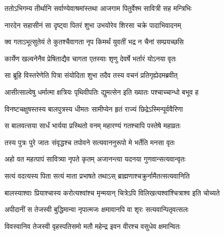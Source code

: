 \twolineshloka
{ततोऽभिगम्य तीर्थानि सर्वाण्येवाश्रमांस्तथा}
{आजगाम पितुर्वेश्म सावित्री सह मन्त्रिभिः}


\twolineshloka
{नारदेन सहासीनं सा दृष्ट्वा पितरं शुभा}
{उभयोरेव शिरसा चक्रे पादाभिवादनम्}




\twolineshloka
{क्व गताऽभूत्सुतेयं ते कुतश्चैवागता नृप}
{किमर्थं युवतीं भद्र न चैनां सम्प्रयच्छसि}




\twolineshloka
{कार्येण खल्वनेनैव प्रेषिताद्यैव चागता}
{एतस्याः शृणु देवर्षे भर्तारं योऽनया वृतः}




\twolineshloka
{सा ब्रूहि विस्तरेणेति पित्रा संयोदिता शुभा}
{तदैव तस्य वचनं प्रतिगृह्येदमब्रवीत्}


\twolineshloka
{आसीत्साल्वेषु धर्मात्मा क्षत्रियः पृथिवीपतिः}
{द्युमत्सेन इति ख्यातः पश्चाच्चान्धो बभूव ह}


\twolineshloka
{विनष्टचक्षुषस्तस्य बालपुत्रस्य धीमतः}
{सामीप्येन हृतं राज्यं छिद्रेऽस्मिन्पूर्ववैरिणा}


\twolineshloka
{स बालवत्सया सार्धं भार्यया प्रस्थितो वनम्}
{महारण्यं गतश्चापि पस्तेषे महाव्रतः}


\twolineshloka
{तस्य पुत्रः पुरे जातः संवृद्धश्च तपोवने}
{सत्यवाननुरूपो मे भर्तेति मनसा वृतः}




\twolineshloka
{अहो वत महत्पापं सावित्र्या नृपते कृतम्}
{अजानन्त्या यदनया गुणवान्सत्यवान्वृतः}


\twolineshloka
{सत्यं वदत्यस्य पिता सत्यं माता प्रभाषते}
{तथाऽस् ब्राह्मणाश्चक्रुर्नामैतत्सत्यवानिति}


\twolineshloka
{बालस्याश्वाः प्रियाश्चास्य करोत्यश्वांश्च मृन्मयान्}
{चित्रेऽपि विलिखत्यश्वांश्चित्राश्व इति चोच्यते}




\twolineshloka
{अपीदानीं स तेजस्वी बुद्धिमान्वा नृपात्मजः}
{क्षमावानपि वा शृरः सत्यवान्पितृवत्सलः}




\twolineshloka
{विवस्वानिव तेजस्वी वृहस्पतिसमो मतौ}
{महेन्द्र इवन वीरश्च वसुधेव क्षमान्वितः}




